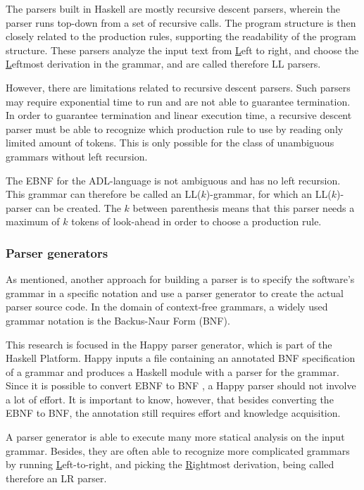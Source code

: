 The parsers built in Haskell are mostly recursive descent parsers, wherein the parser runs top-down from a set of recursive calls.
The program structure is then closely related to the production rules, supporting the readability of the program structure.
These parsers analyze the input text from \underline{L}eft to right, and choose the \underline{L}eftmost derivation in the grammar, and are called therefore LL parsers.

However, there are limitations related to recursive descent parsers.
Such parsers may require exponential time to run and are not able to guarantee termination.
In order to guarantee termination and linear execution time, a recursive descent parser must be able to recognize which production rule to use by reading only limited amount of tokens.
This is only possible for the class of unambiguous grammars without left recursion.

%
%
The EBNF for the ADL-language is not ambiguous and has no left recursion.
This grammar can therefore be called an LL($k$)-grammar, for which an LL($k$)-parser can be created.
The $k$ between parenthesis means that this parser needs a maximum of $k$ tokens of look-ahead in order to choose a production rule.

\subsubsection{Parser generators}
As mentioned, another approach for building a parser is to specify the software's grammar in a specific notation and use a parser generator to create the actual parser source code.
In the domain of context-free grammars, a widely used grammar notation is the Backus-Naur Form (BNF).

This research is focused in the Happy parser generator, which is part of the Haskell Platform.
Happy inputs a file containing an annotated BNF specification of a grammar and produces a Haskell module with a parser for the grammar.
Since it is possible to convert EBNF to BNF \cite{convert-ebnf} \cite{bnf-ebnf}, a Happy parser should not involve a lot of effort.
It is important to know, however, that besides converting the EBNF to BNF, the annotation still requires effort and knowledge acquisition.

%
A parser generator is able to execute many more statical analysis on the input grammar.
Besides, they are often able to recognize more complicated grammars by running \underline{L}eft-to-right, and picking the \underline{R}ightmost derivation, being called therefore an LR parser.

